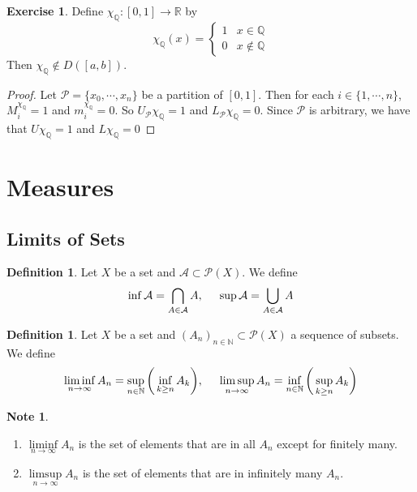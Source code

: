 \documentclass[12pt]{amsart}
\theoremstyle{definition}
\newtheorem{defn}[definition]{Definition}
\newtheorem{note}[definition]{Note}
\newtheorem{ex}[definition]{Exercise}
\newcommand{\N}{\mathbb{N}}
\newcommand{\R}{\mathbb{R}}
\newcommand{\Q}{\mathbb{Q}}
\newcommand{\MA}{\mathcal{A}}
\newcommand{\MP}{\mathcal{P}}
\begin{document}
	\begin{ex}
		Define $\chi_{\Q}:[0,1] \rightarrow \R$ by $$\chi_{\Q}(x) = \begin{cases}
			1 & x \in \Q \\
			0 & x \not \in \Q
		\end{cases}$$
		Then $\chi_\Q \not \in D([a,b])$.
	\end{ex}

	\begin{proof}
		Let $\MP = \{x_0, \cdots, x_n\}$ be a partition of $[0,1]$. Then for each $i \in \{1, \cdots, n\}$, $M^{\chi_{\Q}}_i = 1$ and $m^{\chi_{\Q}}_i = 0$. So $U_\MP \chi_\Q = 1$ and $L_\MP \chi_\Q = 0$. Since $\MP$ is arbitrary, we have that $U \chi_\Q = 1$ and $L \chi_\Q = 0$
	\end{proof}

	
	
	
	
	
	
	
	
	
	
	
	
	
	
	\newpage
	
	\section{Measures}
	
	\subsection{Limits of Sets}
	
	\begin{defn}
		Let $X$ be a set and $\MA \subset \MP(X)$. We define $$\inf \MA = \bigcap_{A \in \MA } A ,\hspace{.5cm} \sup \MA = \bigcup_{A \in \MA} A$$
		
	\end{defn}
	
	\begin{defn}
		Let $X$ be a set and $(A_n)_{n \in \N} \subset \MP(X)$ a sequence of subsets. We define
		$$\liminf_{n \rightarrow \infty} A_n = \sup_{n \in \N} \bigg( \inf_{k \geq n}A_k \bigg), \hspace{.5cm } \limsup_{n \rightarrow \infty} A_n = \inf_{n \in \N} \bigg(\sup_{k \geq n}A_k \bigg)$$
	\end{defn}
	
	\begin{note}\
		\begin{enumerate}
			\item $\liminf\limits_{n \rightarrow \infty} A_n$ is the set of elements that are in all $A_n$ except for finitely many. 
			
			\item $\limsup\limits_{n \rightarrow \infty} A_n$ is the set of elements that are in infinitely many $A_n$.
		\end{enumerate}
	\end{note}
	
\end{document}
